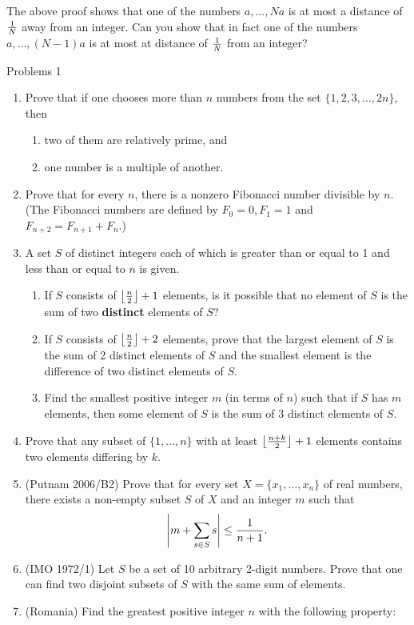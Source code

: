 \begin{rem}
The above proof shows that one of the numbers $a,\ldots, Na$ is at most a distance of $\frac{1}{N}$ away from an integer. Can you show that in fact one of the numbers $a,\ldots, (N-1)a$ is at most at distance of $\frac{1}{N}$ from an integer?
\end{rem} 
\pagebreak
{\Large Problems 1}
\begin{enumerate}
\item Prove that if one chooses more than $n$ numbers from the set
$\{1,2,3,...,2n\}$, then 
\begin{enumerate}
\item two of them are relatively prime, and 
\item one number is a multiple of another.
\end{enumerate}
\item Prove that for every $n$, there is a nonzero Fibonacci number divisible by $n$. (The Fibonacci numbers are defined by $F_0=0, F_1=1$ and $F_{n+2}=F_{n+1}+F_n$.)
\item A set $S$ of distinct integers each of which is greater than or equal to 1 and less than or equal to $n$ is given. 
\begin{enumerate}
\item If $S$ consists of $\left\lfloor {\frac n2}\right\rfloor+1$ elements, is it possible that no element of $S$ is the sum of two \textbf{distinct} elements of $S$? 
\item If $S$ consists of $\left\lfloor {\frac n2}\right\rfloor+2$ elements, prove that the largest element of $S$ is the sum of 2 distinct elements of $S$ and the smallest element is the difference of two distinct elements of $S$. 
\item 
Find the smallest positive integer $m$ (in terms of $n$) such that if $S$ has $m$ elements, then some element of $S$ is the sum of 3 distinct elements of $S$.
\end{enumerate}
\item Prove that any subset of $\{1,\ldots, n\}$ with at least $\left\lfloor {\frac{n+k}{2}}\right\rfloor+1$ elements contains two elements differing by $k$.
\item (Putnam 2006/B2) Prove that for every set $X=\{x_1,\ldots, x_n\}$ of real numbers, there exists a non-empty subset $S$ of $X$ and an integer $m$ such that 
\[\left| {m+\sum_{s\in S} s} \right|\leq \frac{1}{n+1}.\]
\item (IMO 1972/1) Let $S$ be a set of 10 arbitrary 2-digit numbers. Prove that one can
find two disjoint subsets of $S$ with the same sum of elements.
\item (Romania) Find the greatest positive integer $n$ with the following property:

\end{enumerate}
